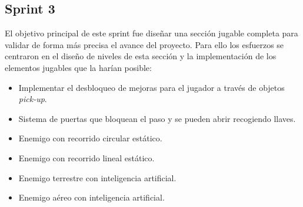 \subsection{Sprint 3}

El objetivo principal de este sprint fue diseñar una sección jugable completa para validar de forma más precisa el avance del proyecto. Para ello los esfuerzos se centraron en el diseño de niveles de esta sección y la implementación de los elementos jugables que la harían posible:

\begin{itemize}
    \item Implementar el desbloqueo de mejoras para el jugador a través de objetos \textit{pick-up}.
    \item Sistema de puertas que bloquean el paso y se pueden abrir recogiendo llaves.
    \item Enemigo con recorrido circular estático.
    \item Enemigo con recorrido lineal estático.
    \item Enemigo terrestre con inteligencia artificial.
    \item Enemigo aéreo con inteligencia artificial.
\end{itemize}

